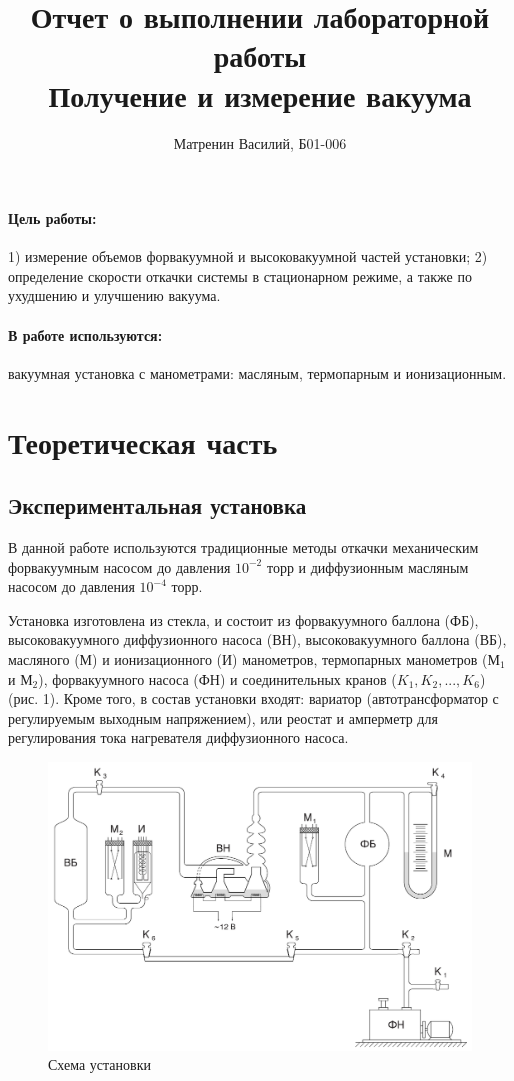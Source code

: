 \documentclass[12pt,a4paper]{article}
\title{
Отчет о выполнении лабораторной работы \labnum \\
Получение и измерение вакуума
}
\author{Матренин Василий, Б01-006}
\begin{document}
\maketitle

\paragraph{Цель работы:} 1) измерение объемов форвакуумной и высоковакуумной частей установки; 2) определение скорости откачки системы в стационарном режиме, а также по ухудшению и улучшению вакуума.
\paragraph{В работе используются:} вакуумная установка с манометрами: масляным, термопарным и ионизационным.

\section{Теоретическая часть}
\subsection*{Экспериментальная установка}
В данной работе используются традиционные методы откачки механическим форвакуумным насосом до давления $10^{-2}$ торр и диффузионным масляным насосом до давления $10^{-4}$ торр.

Установка изготовлена из стекла,
и состоит из форвакуумного баллона (ФБ), высоковакуумного диффузионного насоса (ВН), высоковакуумного баллона (ВБ), масляного (М) и ионизационного (И) манометров, термопарных манометров ($\text{М}_1$ и $\text{М}_2$), форвакуумного насоса (ФН) и соединительных кранов ($K_1, K_2,..., K_6$) (рис. 1). Кроме того, в состав установки входят: вариатор
(автотрансформатор с регулируемым выходным напряжением), или
реостат и амперметр для регулирования тока нагревателя диффузионного насоса. \\
\begin{figure}[!h]
    \centering
    \includegraphics[width=0.4\linewidth]{"picks/Схема установки"}
    \caption[]{Схема установки}
    \label{fig:Схема установки}
\end{figure}
\end{document}
